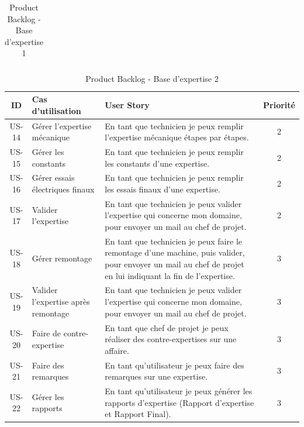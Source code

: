 \documentclass[11pt,a4paper]{article}
\begin{document}
\begin{enumerate}
\begin{table}[H]
\begin{tabular}{|c|p{5cm}|p{8cm}|c|}
\end{tabular}
\caption{Product Backlog -  Base d'expertise 1}
\end{table}

\newpage
\begin{table}[H]
\centering
\begin{tabular}{|c|p{5cm}|p{8cm}|c|}
\hline
\textbf{ID} & \textbf{Cas d'utilisation} & \textbf{User Story} & \textbf{Priorité} \\
\hline

US-14 & Gérer l'expertise mécanique & En tant que technicien je peux remplir l’expertise mécanique étapes par étapes. & 2 \\
\hline
US-15 & Gérer les constants & En tant que technicien je peux remplir les constants d'une expertise. & 2 \\
\hline
US-16 & Gérer essais électriques finaux & En tant que technicien je peux remplir les essais finaux d'une expertise. & 2 \\
\hline
US-17 & Valider l’expertise & En tant que technicien je peux valider l’expertise qui concerne mon domaine, pour envoyer un mail au chef de projet. & 2 \\
\hline
US-18 & Gérer remontage & En tant que technicien je peux faire le remontage d’une machine, puis valider, pour envoyer un mail au chef de projet en lui indiquant la fin de l’expertise. & 3 \\
\hline
US-19 & Valider l’expertise après remontage & En tant que technicien je peux valider l’expertise qui concerne mon domaine, pour envoyer un mail au chef de projet. & 3 \\
\hline
US-20 & Faire de contre-expertise & En tant que chef de projet je peux réaliser des contre-expertises sur une affaire. & 3 \\
\hline
US-21 & Faire des remarques & En tant qu’utilisateur je peux faire des remarques sur une expertise. & 3 \\
\hline
US-22 & Gérer les rapports & En tant qu’utilisateur je peux générer les rapports d'expertise (Rapport d'expertise et Rapport Final). & 3 \\
\hline
\end{tabular}
\caption{Product Backlog - Base d'expertise 2}
\end{table}



\end{enumerate}
\end{document}
